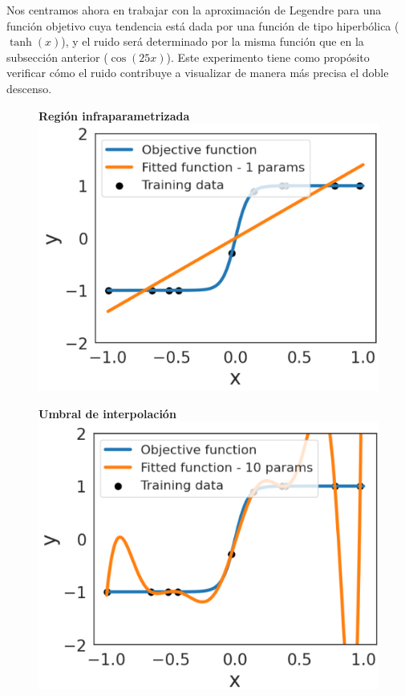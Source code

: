 Nos centramos ahora en trabajar con la aproximación de Legendre para una función objetivo cuya tendencia está dada por una función de tipo hiperbólica ($\tanh(x)$), y el ruido será determinado por la misma función que en la subsección anterior ($\cos(25x)$). Este experimento tiene como propósito verificar cómo el ruido contribuye a visualizar de manera más precisa el doble descenso.

\begin{figure}[h]
    \centering
    \begin{minipage}{0.32\textwidth}
        \centering
        \textbf{Región infraparametrizada} \\[0.5ex] 
        \includegraphics[width=\linewidth]{img/experiments/hiperbolica_noiseless1.1.png}
    \end{minipage}
    \begin{minipage}{0.32\textwidth}
        \centering
        \textbf{Umbral de interpolación} \\[0.5ex] 
        \includegraphics[width=\linewidth]{img/experiments/hiperbolica_noiseless1.2.png}

\end{minipage}
\end{figure}
